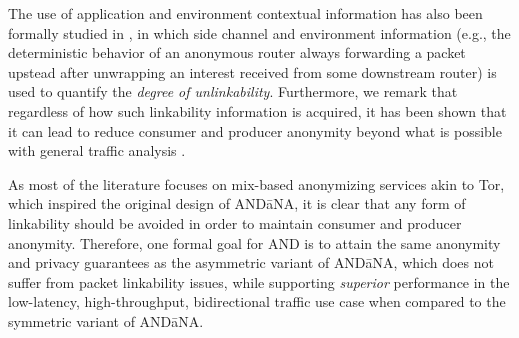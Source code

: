 The use of application and environment contextual information has also been formally studied in \cite{attacking-unlinkability}, in which side channel and environment information (e.g., the deterministic behavior of an anonymous router always forwarding a packet upstead after unwrapping an interest received from some downstream router) is used to quantify the \emph{degree of unlinkability}. Furthermore, we remark that regardless of how such linkability information is acquired, it has been shown that it can lead to reduce consumer and producer anonymity beyond what is possible with general traffic analysis \cite{linkability-attacks}. 

As most of the literature focuses on mix-based anonymizing services akin to Tor, which inspired the original design of {\sf AND\=aNA}, it is clear that any form of linkability should be avoided in order to maintain consumer and producer anonymity. Therefore, one formal goal for {\sf AND} is to attain the same anonymity and privacy guarantees as the asymmetric variant of {\sf AND\=aNA}, which does not suffer from packet linkability issues, while supporting \emph{superior} performance in the low-latency, high-throughput, bidirectional traffic use case when compared to the symmetric variant of {\sf AND\=aNA}.
